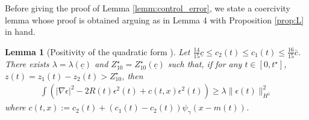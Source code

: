 \documentclass[reqno,10pt]{amsart}
\newtheorem{lemm}{Lemma}[section]
\numberwithin{equation}{section}
\begin{document}
 Before giving the proof of Lemma \ref{lemm:control_error}, we state a coercivity lemma whose proof is obtained arguing as in Lemma 4 \cite{MMT02} with Proposition \ref{prop:L} in hand.
		
		\begin{lemm}[Positivity of the quadratic form \cite{MMT02}]\label{lemm:coercivity}
			Let $\frac{14}{15}\underline{c} \leq c_2(t) \leq c_1(t) \leq \frac{16}{15}\bar{c}$. There exists $\lambda= \lambda (\underline{c})$ and $Z_{10}^{\star}=Z_{10}^{\star}(\underline{c})$ such that, if for any $t\in[0,t^\star]$, $z(t)=z_1(t)-z_2(t)>Z_{10}^{\star}$, then
			\begin{align} \label{lemm:coercivity.1}
				\int  \left( \vert \nabla \epsilon \vert^2 - 2R(t) \epsilon^2(t) + c(t,x) \epsilon^2(t) \right) \geq \lambda \| \epsilon (t) \|_{H^1}^2
			\end{align}
			where $c(t,x):= c_2(t) + (c_1(t)-c_2(t)) \psi_{\gamma}(x-m(t))$.
		\end{lemm}
\end{document}
